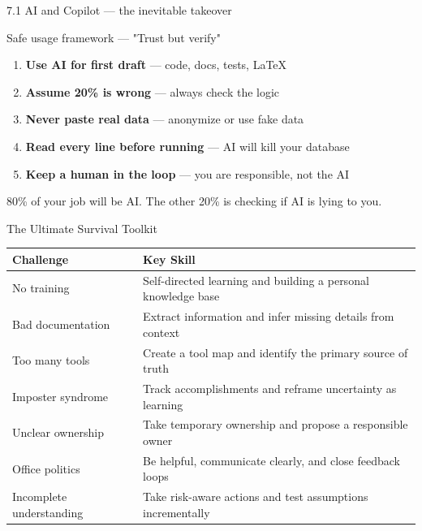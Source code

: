 \documentclass[aspectratio=169, 11pt]{beamer}
\begin{document}
\begin{frame}{7.1 AI and Copilot — the inevitable takeover}
	\vspace{0.03cm}
	
	\begin{block}{Safe usage framework — "Trust but verify"}
		\tiny
		\begin{enumerate}
			\item \textbf{Use AI for first draft} — code, docs, tests, LaTeX
			\item \textbf{Assume 20\% is wrong} — always check the logic
			\item \textbf{Never paste real data} — anonymize or use fake data
			\item \textbf{Read every line before running} — AI will kill your database
			\item \textbf{Keep a human in the loop} — you are responsible, not the AI
		\end{enumerate}
	\end{block}
	
	\vspace{0.03cm}
	\tiny\alert{80\% of your job will be AI. The other 20\% is checking if AI is lying to you.}
\end{frame}

\begin{frame}{The Ultimate Survival Toolkit}
	\begin{center}
		\small
		\begin{tabular}{p{4cm} p{7cm}}
			\toprule
			\textbf{Challenge} & \textbf{Key Skill} \\
			\midrule
			No training & Self-directed learning and building a personal knowledge base \\
			Bad documentation & Extract information and infer missing details from context \\
			Too many tools & Create a tool map and identify the primary source of truth \\
			Imposter syndrome & Track accomplishments and reframe uncertainty as learning \\
			Unclear ownership & Take temporary ownership and propose a responsible owner \\
			Office politics & Be helpful, communicate clearly, and close feedback loops \\
			Incomplete understanding & Take risk-aware actions and test assumptions incrementally \\
			\bottomrule
		\end{tabular}
	\end{center}
\end{frame}
	
\end{document}
